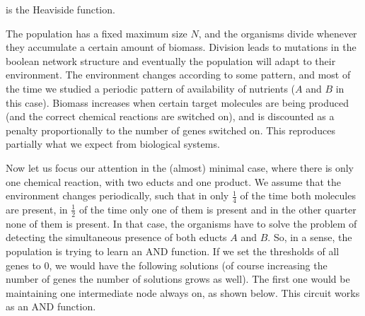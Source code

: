 \documentclass{article}
\begin{document}
is the Heaviside function.

The population has a fixed maximum size $N$, and the organisms divide whenever they accumulate a certain amount of biomass. Division leads to mutations in the boolean 
network structure and eventually the population will adapt to their environment. The environment changes according to some pattern, and most of the time we studied 
a periodic pattern of availability of nutrients ($A$ and $B$ in this case). Biomass increases when certain target molecules are being produced (and the correct chemical 
reactions are switched on), and is discounted as a penalty proportionally to the number of genes switched on. This reproduces partially what we expect from biological 
systems.

Now let us focus our attention in the (almost) minimal case, where there is only one chemical reaction, with two educts and one product. We assume that the environment 
changes periodically, such that in only $\frac{1}{4}$ of the time both molecules are present, in $\frac{1}{2}$ of the time only one of them is present and in the other 
quarter none of them is present. In that case, the organisms have to solve the problem of detecting the simultaneous presence of both educts $A$ and $B$. So, in a sense, 
the population is trying to learn an AND function. If we set the thresholds of all genes to $0$, we would have the following solutions (of course increasing the number of 
genes the number of solutions grows as well). The first one would be maintaining one intermediate node always on, as shown below. This circuit works as an AND function.

\end{document}
